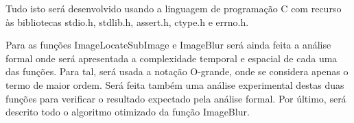 {Tudo isto será desenvolvido usando a linguagem de programação C com recurso às bibliotecas stdio.h, stdlib.h, assert.h, ctype.h e errno.h.

\vspace{0.5cm}

Para as funções ImageLocateSubImage e ImageBlur será ainda feita a análise formal onde será apresentada a complexidade temporal e espacial de cada uma das funções. Para tal, será usada a notação O-grande, onde se considera apenas o termo de maior ordem. Será feita também uma análise experimental destas duas funções para verificar o resultado expectado pela análise formal. Por último, será descrito todo o algoritmo otimizado da função ImageBlur.

}
